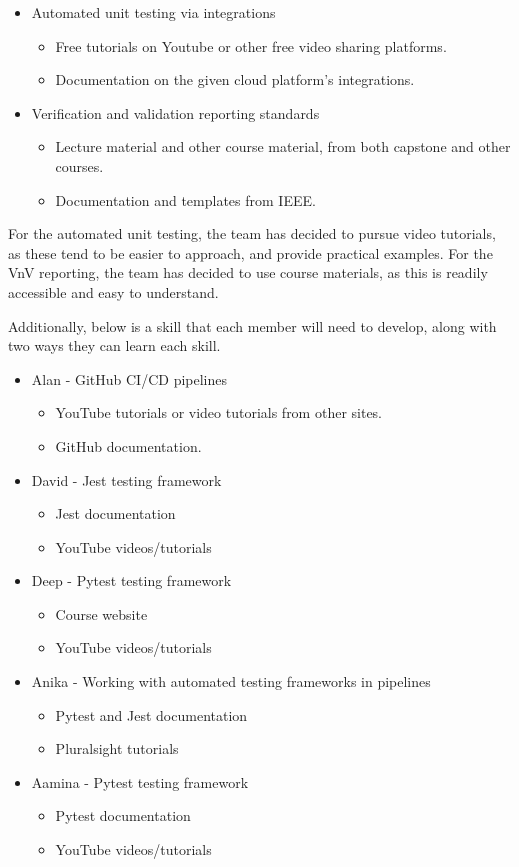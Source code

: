 \documentclass[12pt, titlepage]{article}
\begin{document}
\begin{itemize}
\item Automated unit testing via integrations
\begin{itemize}
\item Free tutorials on Youtube or other free video sharing platforms.
\item Documentation on the given cloud platform's integrations.
\end{itemize}
\item Verification and validation reporting standards
\begin{itemize}
\item Lecture material and other course material, from both capstone and other courses.
\item Documentation and templates from IEEE.
\end{itemize}
\end{itemize}
For the automated unit testing, the team has decided to pursue video tutorials, as these tend to be easier to approach, and provide practical examples. For the VnV reporting, the team has decided to use course materials, as this is readily accessible and easy to understand.


Additionally, below is a skill that each member will need to develop, along with two ways they can learn each skill.
\begin{itemize}
\item Alan - GitHub CI/CD pipelines
\begin{itemize}
\item YouTube tutorials or video tutorials from other sites.
\item GitHub documentation.
\end{itemize}
\item David - Jest testing framework
\begin{itemize}
  \item Jest documentation
  \item YouTube videos/tutorials 
\end{itemize}
\item Deep - Pytest testing framework
\begin{itemize}
  \item Course website
  \item YouTube videos/tutorials 
\end{itemize}
\item Anika - Working with automated testing frameworks in pipelines
  \begin {itemize}
    \item Pytest and Jest documentation
    \item Pluralsight tutorials
  \end {itemize}
\item Aamina - Pytest testing framework
  \begin {itemize}
    \item Pytest documentation
    \item YouTube videos/tutorials
  \end {itemize}
\end{itemize}
\end{document}
